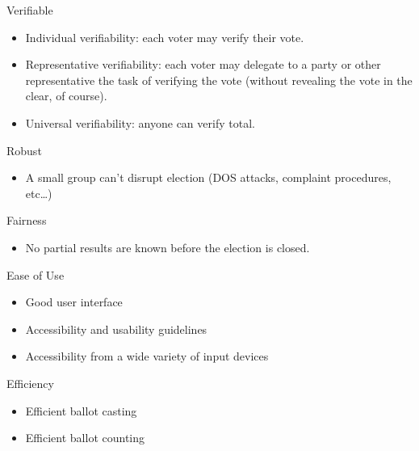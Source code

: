 \documentclass[utf8]{beamer}
\begin{document}
\begin{frame}{Verifiable}

\begin{itemize}
\item Individual verifiability: each voter may verify their vote.
\item Representative verifiability: each voter may delegate to a party
  or other representative the task of verifying the vote (without
  revealing the vote in the clear, of course).
\item Universal verifiability: anyone can verify total.
\end{itemize}

\end{frame}

\begin{frame}{Robust}

\begin{itemize}
\item A small group can't disrupt election (DOS attacks, complaint
  procedures, etc\ldots)
\end{itemize}

\end{frame}

\begin{frame}{Fairness}

\begin{itemize}
  \item No partial results are known before the election is closed.
  \end{itemize}
  
\end{frame}

\begin{frame}{Ease of Use}

\begin{itemize}
  \item Good user interface
  \item Accessibility and usability guidelines
  \item Accessibility from a wide variety of input devices
\end{itemize}

\end{frame}

\begin{frame}{Efficiency}

  \begin{itemize}
  \item Efficient ballot casting
  \item Efficient ballot counting
  \end{itemize}
  
\end{frame}
\end{document}
